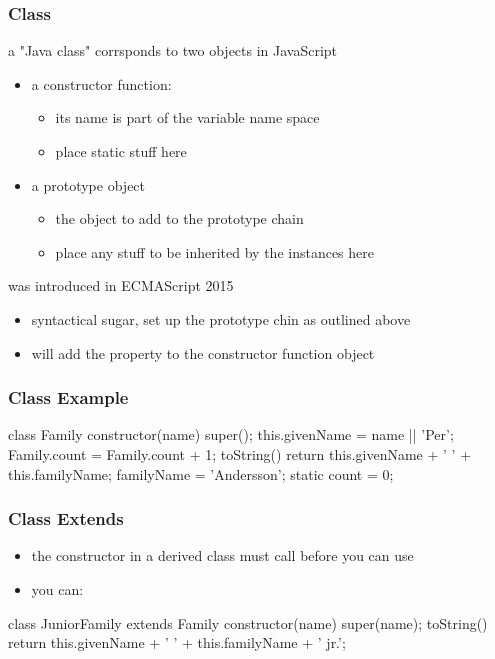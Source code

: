 \begin{frame}[fragile] \frametitle{Class}
a "Java class" corrsponds to two objects in JavaScript
\begin{itemize}
  \item a constructor function:
  \begin{itemize}
    \item its name is part of the variable name space
    \item place static stuff here
  \end{itemize}
  \item a prototype object
  \begin{itemize}
    \item the object to add to the prototype chain
    \item place any stuff to be inherited by the instances here
  \end{itemize}
\end{itemize}
\vspace{5mm}

 was introduced in ECMAScript 2015
\begin{itemize}
  \item syntactical sugar, set up the prototype chin as outlined above
  \item {} will add the property to the constructor function object
\end{itemize}
\end{frame}
\begin{frame}[fragile] \frametitle{Class Example}
\begin{CodeBox}{}
class Family {
  constructor(name) {
    super();
    this.givenName = name || 'Per';
    Family.count = Family.count + 1;
  }
  toString() {
    return this.givenName + ' ' + this.familyName;
  }
  familyName = 'Andersson';
  static count = 0;
}
\end{CodeBox}
\end{frame}

\begin{frame}[fragile] \frametitle{Class Extends}
\begin{itemize}
  \item the constructor in a derived class must call  before you can use 
  \item you can: 
\end{itemize}
\begin{CodeBox}{}
class JuniorFamily extends Family {
  constructor(name) {
    super(name);
  }
 toString() {
   return this.givenName + ' ' + 
              this.familyName + '  jr.';
  }
}
\end{CodeBox}
\end{frame}

